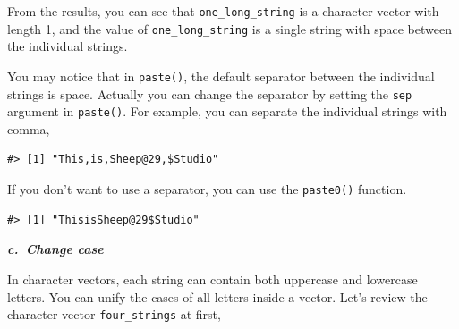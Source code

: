 \documentclass[
]{book}
\newenvironment{Shaded}{\begin{snugshade}}{\end{snugshade}}
\newcommand{\AttributeTok}[1]{\textcolor[rgb]{0.77,0.63,0.00}{#1}}
\newcommand{\FunctionTok}[1]{\textcolor[rgb]{0.00,0.00,0.00}{#1}}
\newcommand{\NormalTok}[1]{#1}
\newcommand{\OtherTok}[1]{\textcolor[rgb]{0.56,0.35,0.01}{#1}}
\newcommand{\StringTok}[1]{\textcolor[rgb]{0.31,0.60,0.02}{#1}}
\begin{document}
From the results, you can see that \texttt{one\_long\_string} is a character vector with length 1, and the value of \texttt{one\_long\_string} is a single string with space between the individual strings.

You may notice that in \texttt{paste()}, the default separator between the individual strings is space. Actually you can change the separator by setting the \texttt{sep} argument in \texttt{paste()}. For example, you can separate the individual strings with comma,

\begin{Shaded}
\end{Shaded}

\begin{verbatim}
#> [1] "This,is,Sheep@29,$Studio"
\end{verbatim}

If you don't want to use a separator, you can use the \texttt{paste0()} function.

\begin{Shaded}
\end{Shaded}

\begin{verbatim}
#> [1] "ThisisSheep@29$Studio"
\end{verbatim}

\textbf{\emph{c.~Change case}}

In character vectors, each string can contain both uppercase and lowercase letters. You can unify the cases of all letters inside a vector. Let's review the character vector \texttt{four\_strings} at first,

\begin{Shaded}
\end{Shaded}
\end{document}
